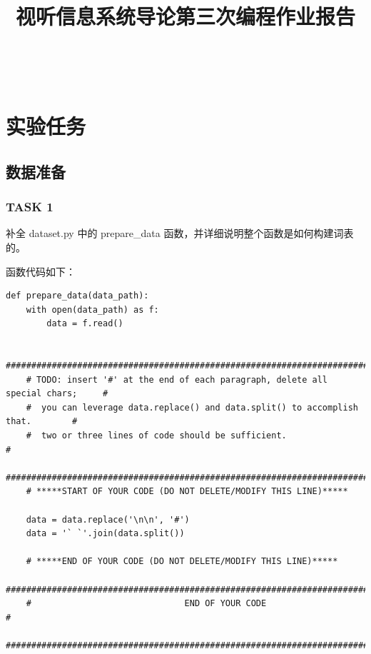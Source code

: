 \documentclass{article}%
\title{视听信息系统导论第三次编程作业报告}
\begin{document}
\begin{titlepage}
    \thispagestyle{empty}
    \vspace*{4cm} %
    \begin{center}
    {\LARGE \textbf{\thetitle}}\\
    \vspace{6cm}
    \end{center}
    \vspace*{\fill} %
\end{titlepage}

\setlength{\baselineskip}{22pt}
\tableofcontents
\clearpage

\section{实验任务}

\subsection{数据准备}
\subsubsection{TASK 1}
补全 dataset.py 中的 prepare\_data 函数，并详细说明整个函数是如何构建词表的。

函数代码如下：
\begin{lstlisting}
def prepare_data(data_path):
    with open(data_path) as f:
        data = f.read()

    ################################################################################
    # TODO: insert '#' at the end of each paragraph, delete all special chars;     #
    #  you can leverage data.replace() and data.split() to accomplish that.        #
    #  two or three lines of code should be sufficient.                            #
    ################################################################################
    # *****START OF YOUR CODE (DO NOT DELETE/MODIFY THIS LINE)*****

    data = data.replace('\n\n', '#')
    data = '` `'.join(data.split())
    
    # *****END OF YOUR CODE (DO NOT DELETE/MODIFY THIS LINE)*****
    ################################################################################
    #                              END OF YOUR CODE                                #
    ################################################################################
\end{lstlisting}
\end{document}
